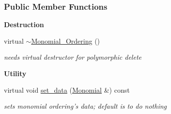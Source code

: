 \subsubsection*{Public Member Functions}
\begin{Indent}\textbf{ Destruction}\par
\begin{DoxyCompactItemize}
\item 
\mbox{\label{group__orderinggroup_a6f507bd325e959ce867880d4696a99cc}} 
virtual \hyperlink{group__orderinggroup_a6f507bd325e959ce867880d4696a99cc}{$\sim$\+Monomial\+\_\+\+Ordering} ()
\begin{DoxyCompactList}\small\item\em needs virtual destructor for polymorphic {\ttfamily delete} \end{DoxyCompactList}\end{DoxyCompactItemize}
\end{Indent}
\begin{Indent}\textbf{ Utility}\par
\begin{DoxyCompactItemize}
\item 
virtual void \hyperlink{group__orderinggroup_a22b08dffd1cdf3a655ca18d604cfcee1}{set\+\_\+data} (\hyperlink{group__polygroup_class_monomial}{Monomial} \&) const
\begin{DoxyCompactList}\small\item\em sets monomial ordering's data; default is to do nothing \end{DoxyCompactList}\end{DoxyCompactItemize}
\end{Indent}
